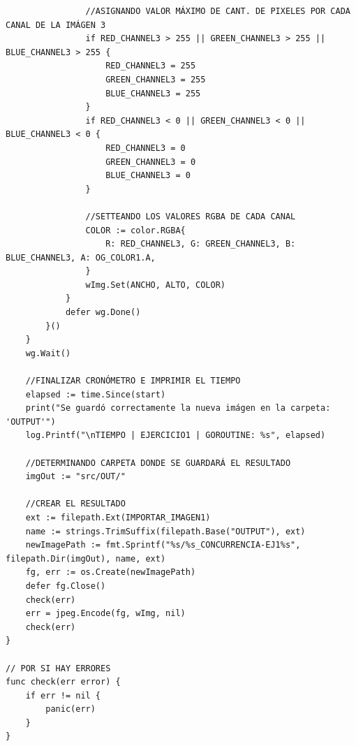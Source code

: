 \documentclass{article}
\begin{document}
\begin{verbatim}
				//ASIGNANDO VALOR MÁXIMO DE CANT. DE PIXELES POR CADA CANAL DE LA IMÁGEN 3
				if RED_CHANNEL3 > 255 || GREEN_CHANNEL3 > 255 || BLUE_CHANNEL3 > 255 {
					RED_CHANNEL3 = 255
					GREEN_CHANNEL3 = 255
					BLUE_CHANNEL3 = 255
				}
				if RED_CHANNEL3 < 0 || GREEN_CHANNEL3 < 0 || BLUE_CHANNEL3 < 0 {
					RED_CHANNEL3 = 0
					GREEN_CHANNEL3 = 0
					BLUE_CHANNEL3 = 0
				}

				//SETTEANDO LOS VALORES RGBA DE CADA CANAL
				COLOR := color.RGBA{
					R: RED_CHANNEL3, G: GREEN_CHANNEL3, B: BLUE_CHANNEL3, A: OG_COLOR1.A,
				}
				wImg.Set(ANCHO, ALTO, COLOR)
			}
			defer wg.Done()
		}()
	}
	wg.Wait()

	//FINALIZAR CRONÓMETRO E IMPRIMIR EL TIEMPO
	elapsed := time.Since(start)
	print("Se guardó correctamente la nueva imágen en la carpeta: 'OUTPUT'")
	log.Printf("\nTIEMPO | EJERCICIO1 | GOROUTINE: %s", elapsed)

	//DETERMINANDO CARPETA DONDE SE GUARDARÁ EL RESULTADO
	imgOut := "src/OUT/"

	//CREAR EL RESULTADO
	ext := filepath.Ext(IMPORTAR_IMAGEN1)
	name := strings.TrimSuffix(filepath.Base("OUTPUT"), ext)
	newImagePath := fmt.Sprintf("%s/%s_CONCURRENCIA-EJ1%s", filepath.Dir(imgOut), name, ext)
	fg, err := os.Create(newImagePath)
	defer fg.Close()
	check(err)
	err = jpeg.Encode(fg, wImg, nil)
	check(err)
}

// POR SI HAY ERRORES
func check(err error) {
	if err != nil {
		panic(err)
	}
}
\end{verbatim}
\end{document}
